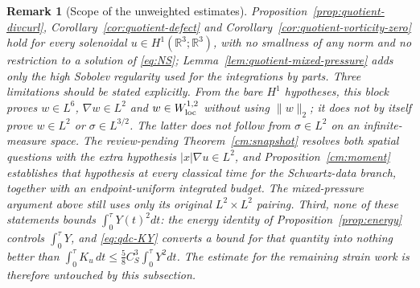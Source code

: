 \documentclass[11pt]{article}
\newtheorem{remark}[theorem]{Remark}
\theoremstyle{definition}
\theoremstyle{plain}
\newcommand{\R}{\mathbb R}
\begin{document}
\begin{remark}[Scope of the unweighted estimates]
\label{rem:quotient-divcurl-scope}
Proposition~\ref{prop:quotient-divcurl},
Corollary~\ref{cor:quotient-defect} and
Corollary~\ref{cor:quotient-vorticity-zero} hold for \emph{every} solenoidal
$u\in H^1(\R^3;\R^3)$, with no smallness of any norm and no restriction to a
solution of \eqref{eq:NS}; Lemma~\ref{lem:quotient-mixed-pressure} adds only
the high Sobolev regularity used for the integrations by parts.  Three
limitations should be stated explicitly. From the bare $H^1$ hypotheses,
this block proves $w\in L^6$, $\nabla w\in L^2$ and
$w\in W^{1,2}_{\rm loc}$ without using $\|w\|_2$; it does not by itself
prove $w\in L^2$ or $\sigma\in L^{3/2}$. The latter does not follow from
$\sigma\in L^2$ on an infinite-measure space. The review-pending
Theorem~\ref{cm:snapshot} resolves both spatial questions with the extra
hypothesis $|x|\nabla u\in L^2$, and Proposition~\ref{cm:moment} establishes
that hypothesis at every classical time for the Schwartz-data branch,
together with an endpoint-uniform integrated budget. The mixed-pressure
argument above still uses only its original $L^2\times L^2$ pairing.
Third, none of these
statements bounds $\int_0^\tau Y(t)^2dt$: the energy identity of
Proposition~\ref{prop:energy} controls $\int_0^\tau Y$, and
\eqref{eq:qdc-KY} converts a bound for that quantity into nothing better
than $\int_0^\tau K_u\,dt\le\frac58C_S^3\int_0^\tau Y^2dt$.  The estimate
for the remaining strain work is therefore untouched by this subsection.
\end{remark}
\end{document}
